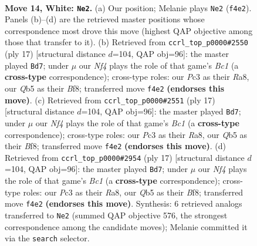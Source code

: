 \documentclass[11pt]{article}
\begin{document}
\clearpage

\begin{figure}[p]\centering
\begin{subfigure}{0.46\textwidth}\centering
\resizebox{\linewidth}{!}{%
\newchessgame
\chessboard[
  setfen={rnbq1k1r/1p2n3/4p3/pQPpPp2/3B1Npp/P1P5/2P2PPP/R3KB1R w KQ - 0 14},
  showmover=false,
  pgfstyle=straightmove, color=movearrow, markmove={f4-e2}
]}
\caption{}
\end{subfigure}\hfill
\begin{subfigure}{0.46\textwidth}\centering
\resizebox{\linewidth}{!}{%
\newchessgame
\chessboard[
  setfen={r1b1kb1r/pp3p1p/1qn1p2p/3pP3/1P1P4/P4N2/5PPP/RN1QKB1R b KQkq - 0 9},
  showmover=false,
  pgfstyle=straightmove, color=movearrow, markmove={c8-d7}
]}
\caption{}
\end{subfigure}
\\[4pt]
\begin{subfigure}{0.46\textwidth}\centering
\resizebox{\linewidth}{!}{%
\newchessgame
\chessboard[
  setfen={r1b1kb1r/pp3p1p/1qn1p2p/3pP3/1P1P4/P4N2/5PPP/RN1QKB1R b KQkq - 0 9},
  showmover=false,
  pgfstyle=straightmove, color=movearrow, markmove={c8-d7}
]}
\caption{}
\end{subfigure}\hfill
\begin{subfigure}{0.46\textwidth}\centering
\resizebox{\linewidth}{!}{%
\newchessgame
\chessboard[
  setfen={r1b1kb1r/pp3p1p/1qn1p2p/3pP3/1P1P4/P4N2/5PPP/RN1QKB1R b KQkq - 0 9},
  showmover=false,
  pgfstyle=straightmove, color=movearrow, markmove={c8-d7}
]}
\caption{}
\end{subfigure}
\caption{\textbf{Move 14, White: \texttt{Ne2}.} (a) Our position; Melanie plays \texttt{Ne2} (\texttt{f4e2}). Panels (b)--(d) are the retrieved master positions whose correspondence most drove this move (highest QAP objective among those that transfer to it). (b) Retrieved from \texttt{ccrl\_top\_p0000\#2550} (ply 17) [structural distance $d$=104, QAP obj=96]: the master played \texttt{Bd7}; under $\mu$ our \emph{Nf4} plays the role of that game's \emph{Bc1} (a \textbf{cross-type} correspondence); cross-type roles: our \emph{P}c3 as their \emph{R}a8, our \emph{Q}b5 as their \emph{B}f8; transferred move \texttt{f4e2} \textbf{(endorses this move)}. (c) Retrieved from \texttt{ccrl\_top\_p0000\#2551} (ply 17) [structural distance $d$=104, QAP obj=96]: the master played \texttt{Bd7}; under $\mu$ our \emph{Nf4} plays the role of that game's \emph{Bc1} (a \textbf{cross-type} correspondence); cross-type roles: our \emph{P}c3 as their \emph{R}a8, our \emph{Q}b5 as their \emph{B}f8; transferred move \texttt{f4e2} \textbf{(endorses this move)}. (d) Retrieved from \texttt{ccrl\_top\_p0000\#2954} (ply 17) [structural distance $d$=104, QAP obj=96]: the master played \texttt{Bd7}; under $\mu$ our \emph{Nf4} plays the role of that game's \emph{Bc1} (a \textbf{cross-type} correspondence); cross-type roles: our \emph{P}c3 as their \emph{R}a8, our \emph{Q}b5 as their \emph{B}f8; transferred move \texttt{f4e2} \textbf{(endorses this move)}. Synthesis: 6 retrieved analogs transferred to \texttt{Ne2} (summed QAP objective 576, the strongest correspondence among the candidate moves); Melanie committed it via the \texttt{search} selector.}

\end{figure}
\end{document}
